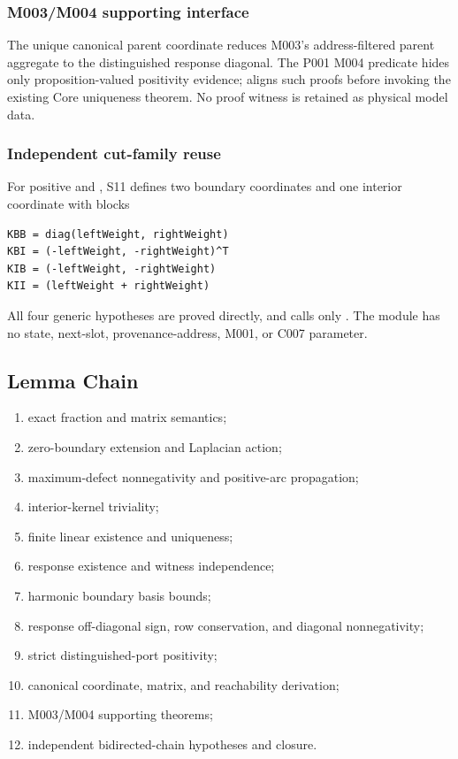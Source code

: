 \subsubsection{M003/M004 supporting
interface}\label{m003m004-supporting-interface}

The unique canonical parent coordinate reduces M003's address-filtered
parent aggregate to the distinguished response diagonal. The P001 M004
predicate hides only proposition-valued positivity evidence;
\texttt{\protect{}} aligns such proofs before invoking the
existing Core uniqueness theorem. No proof witness is retained as
physical model data.

\subsubsection{Independent cut-family
reuse}\label{independent-cut-family-reuse}

For positive \texttt{\protect{}} and \texttt{\protect{}}, S11 defines
two boundary coordinates and one interior coordinate with blocks

\begin{verbatim}
KBB = diag(leftWeight, rightWeight)
KBI = (-leftWeight, -rightWeight)^T
KIB = (-leftWeight, -rightWeight)
KII = (leftWeight + rightWeight)
\end{verbatim}

All four generic hypotheses are proved directly, and
\texttt{\protect{}} calls only
\texttt{\protect{}}. The module has no state, next-slot,
provenance-address, M001, or C007 parameter.

\subsection{Lemma Chain}\label{lemma-chain-9}

\begin{enumerate}
\def\labelenumi{\arabic{enumi}.}
\tightlist
\item
  exact fraction and matrix semantics;
\item
  zero-boundary extension and Laplacian action;
\item
  maximum-defect nonnegativity and positive-arc propagation;
\item
  interior-kernel triviality;
\item
  finite linear existence and uniqueness;
\item
  response existence and witness independence;
\item
  harmonic boundary basis bounds;
\item
  response off-diagonal sign, row conservation, and diagonal
  nonnegativity;
\item
  strict distinguished-port positivity;
\item
  canonical coordinate, matrix, and reachability derivation;
\item
  M003/M004 supporting theorems;
\item
  independent bidirected-chain hypotheses and closure.
\end{enumerate}

